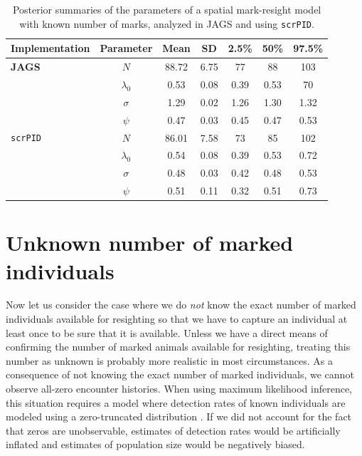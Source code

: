\begin{table}
\label{partialID.tab.knownm}
\centering
  \caption{Posterior summaries of the parameters of a spatial mark-resight model with known number of marks, analyzed in JAGS and using {\tt scrPID}.}
  \begin{tabular}{lcccccc}
             \hline
  Implementation & Parameter   & Mean  & SD   & 2.5\% & 50\% & 97.5\% \\
           \hline
{\bf JAGS}       & $N$         & 88.72 & 6.75 & 77    & 88   & 103    \\
		 & $\lambda_0$ & 0.53  & 0.08 & 0.39  & 0.53 & 70     \\
		 & $\sigma$    & 1.29  & 0.02 & 1.26  & 1.30 & 1.32   \\
		 & $\psi$      & 0.47  & 0.03 & 0.45  & 0.47 & 0.53   \\
		\hline
{\tt scrPID}     & $N$         & 86.01 & 7.58 & 73    & 85   & 102    \\
		 & $\lambda_0$ & 0.54  & 0.08 & 0.39  & 0.53 & 0.72   \\
		 & $\sigma$    & 0.48  & 0.03 & 0.42  & 0.48 & 0.53   \\
		 & $\psi$      & 0.51  & 0.11 & 0.32  & 0.51 & 0.73   \\
			\hline
  \end{tabular}
\end{table}


\section {Unknown number of marked individuals}
\label{partialID.sec.unknown}
Now let us consider the case where we do {\it not} know the exact
number of marked individuals available for resighting so that we have
to capture an individual at least once to be sure that it is
available. Unless we have a direct means of confirming the number of
marked animals available for resighting, treating this number as
unknown is probably more realistic in most circumstances. As a
consequence of not knowing the exact number of marked individuals, we
cannot observe all-zero encounter histories. When using maximum
likelihood inference, this situation requires a model where detection
rates of known individuals are modeled using a zero-truncated
distribution \citep{mcclintock_etal:2009biometrics}. If we did not
account for the fact that zeros are unobservable, estimates of
detection rates would be artificially inflated and estimates of
population size would be negatively biased.

